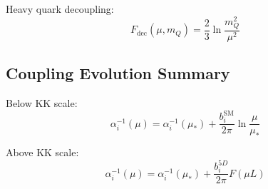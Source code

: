 \documentclass[11pt,a4paper]{article}
\theoremstyle{definition}
\begin{document}
Heavy quark decoupling:
\begin{equation}
\label{eq:heavy-decoupling}
F_{\text{dec}}(\mu, m_Q) = \frac{2}{3} \ln\frac{m_Q^2}{\mu^2}
\end{equation}

\subsection{Coupling Evolution Summary}
\label{subsec:coupling-evolution}

Below KK scale:
\begin{equation}
\label{eq:below-kk}
\alpha_i^{-1}(\mu) = \alpha_i^{-1}(\mu_*) + \frac{b_i^{\text{SM}}}{2\pi} \ln\frac{\mu}{\mu_*}
\end{equation}

Above KK scale:
\begin{equation}
\label{eq:above-kk}
\alpha_i^{-1}(\mu) = \alpha_i^{-1}(\mu_*) + \frac{b_i^{5D}}{2\pi} F(\mu L)
\end{equation}

\end{document}
